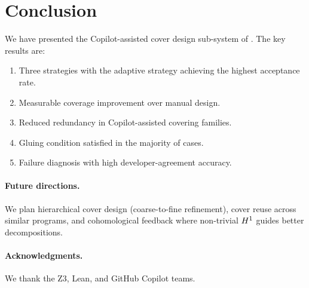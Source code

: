 \documentclass[11pt]{article}
\begin{document}
\section{Conclusion}\label{sec:conclusion}

We have presented the Copilot-assisted cover design sub-system of \JuGeo{}.
The key results are:

\begin{enumerate}[leftmargin=2em]
  \item Three strategies with the adaptive strategy achieving the highest
        acceptance rate.
  \item Measurable coverage improvement over manual design.
  \item Reduced redundancy in Copilot-assisted covering families.
  \item Gluing condition satisfied in the majority of cases.
  \item Failure diagnosis with high developer-agreement accuracy.
\end{enumerate}

\paragraph{Future directions.}
We plan hierarchical cover design (coarse-to-fine refinement),
cover reuse across similar programs, and cohomological feedback where
non-trivial $H^{1}$ guides better decompositions.

\paragraph{Acknowledgments.}
We thank the Z3, Lean, and GitHub Copilot teams.
\end{document}
